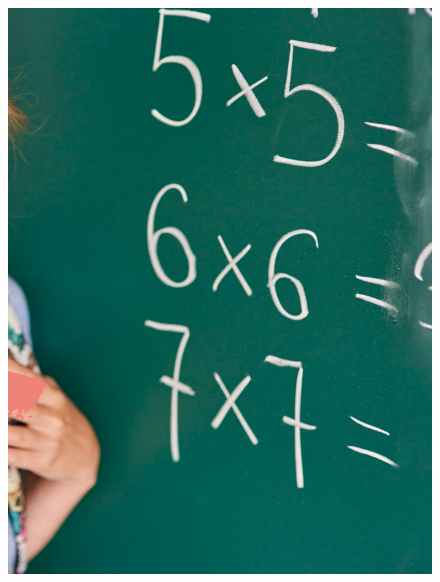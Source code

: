 \begin{figure}[htpb]
\vspace*{-2.5cm}
\hspace{-3cm}\includegraphics[height=\paperheight]{../separadores/separadorMAT5B.png}
\end{figure}


\blankpage

